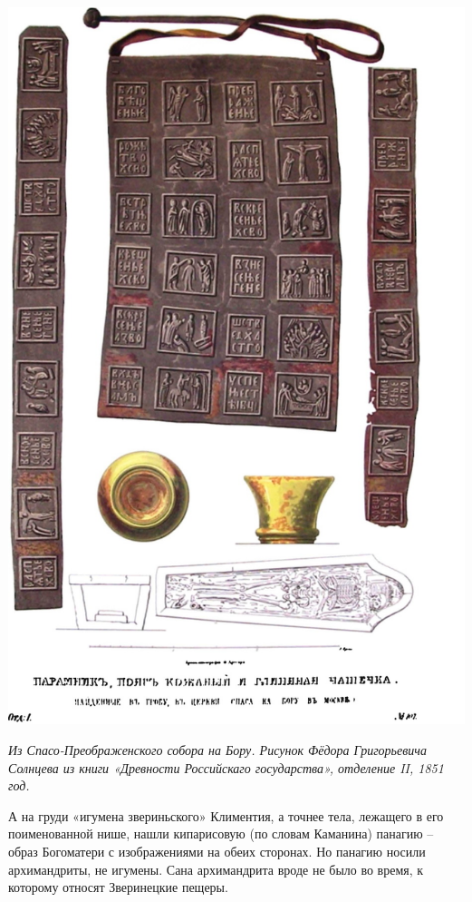 \begin{center}
\includegraphics[width=0.94\linewidth]{chast-colebanie-osnov/nachalo/s-Drevnosti_RG_v1_ill108.jpg}
\end{center}

\textit{Из Спасо-Преображенского собора на Бору. Рисунок Фёдора Григорьевича Солнцева из книги «Древности Российскаго государства», отделение II, 1851 год.}

\newpage



А на груди «игумена звериньского» Климентия, а точнее тела, лежащего в его поименованной нише, нашли кипарисовую (по словам Каманина) панагию – образ Богоматери с изображениями на обеих сторонах. Но панагию носили архимандриты, не игумены. Сана архимандрита вроде не было во время, к которому относят Зверинецкие пещеры.

